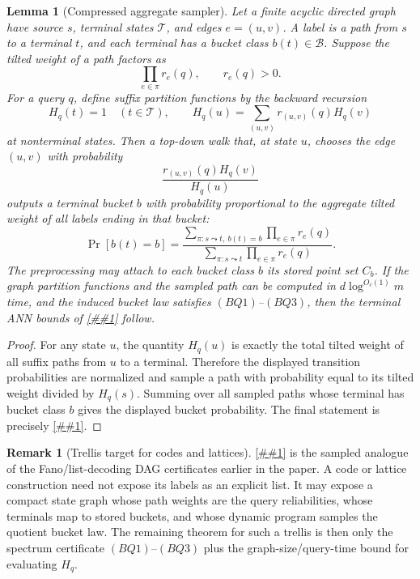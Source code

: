 \documentclass[10pt]{article}
\newcommand{\cref}[1]{\ref{##1}}
\newcommand{\Cref}[1]{\ref{##1}}
\newtheorem{lemma}[theorem]{Lemma}
\theoremstyle{definition}
\newtheorem{remark}[theorem]{Remark}
\begin{document}
\begin{lemma}[Compressed aggregate sampler]
   \label{lem:compressed-aggregate-sampler}
   Let a finite acyclic directed graph have source \(s\), terminal states
   \(\mathcal T\), and edges \(e=(u,v)\).  A label is a path from \(s\) to a
   terminal \(t\), and each terminal has a bucket class \(b(t)\in\mathcal B\).
   Suppose the tilted weight of a path factors as
   \[
      \prod_{e\in\pi}r_e(q),
      \qquad r_e(q)>0.
   \]
   For a query \(q\), define suffix partition functions by the backward
   recursion
   \[
      H_q(t)=1\quad(t\in\mathcal T),
      \qquad
      H_q(u)=\sum_{(u,v)}r_{(u,v)}(q)H_q(v)
   \]
   at nonterminal states.  Then a top-down walk that, at state \(u\), chooses
   the edge \((u,v)\) with probability
   \[
      \frac{r_{(u,v)}(q)H_q(v)}{H_q(u)}
   \]
   outputs a terminal bucket \(b\) with probability proportional to the
   aggregate tilted weight of all labels ending in that bucket:
   \[
      \Pr[b(t)=b]
      =
      \frac{
         \sum_{\pi:s\leadsto t,\ b(t)=b}\prod_{e\in\pi}r_e(q)
      }{
         \sum_{\pi:s\leadsto t}\prod_{e\in\pi}r_e(q)
      } .
   \]
   The preprocessing may attach to each bucket class \(b\) its stored point set
   \(C_b\).  If the graph partition functions and the sampled path can be
   computed in \(d\log^{O_c(1)}m\) time, and the induced bucket law satisfies
   \((BQ1)\)--\((BQ3)\), then the terminal ANN bounds of
   \cref{prop:sampled-structured-panel} follow.
\end{lemma}

\begin{proof}
   For any state \(u\), the quantity \(H_q(u)\) is exactly the total tilted
   weight of all suffix paths from \(u\) to a terminal.  Therefore the displayed
   transition probabilities are normalized and sample a path with probability
   equal to its tilted weight divided by \(H_q(s)\).  Summing over all sampled
   paths whose terminal has bucket class \(b\) gives the displayed bucket
   probability.  The final statement is precisely
   \cref{cor:bucket-quotient-quadrature}.
\end{proof}

\begin{remark}[Trellis target for codes and lattices]
   \label{rem:trellis-quotient-target}
   \Cref{lem:compressed-aggregate-sampler} is the sampled analogue of the
   Fano/list-decoding DAG certificates earlier in the paper.  A code or lattice
   construction need not expose its labels as an explicit list.  It may expose
   a compact state graph whose path weights are the query reliabilities, whose
   terminals map to stored buckets, and whose dynamic program samples the
   quotient bucket law.  The remaining theorem for such a trellis is then only
   the spectrum certificate \((BQ1)\)--\((BQ3)\) plus the graph-size/query-time
   bound for evaluating \(H_q\).
\end{remark}
\end{document}
